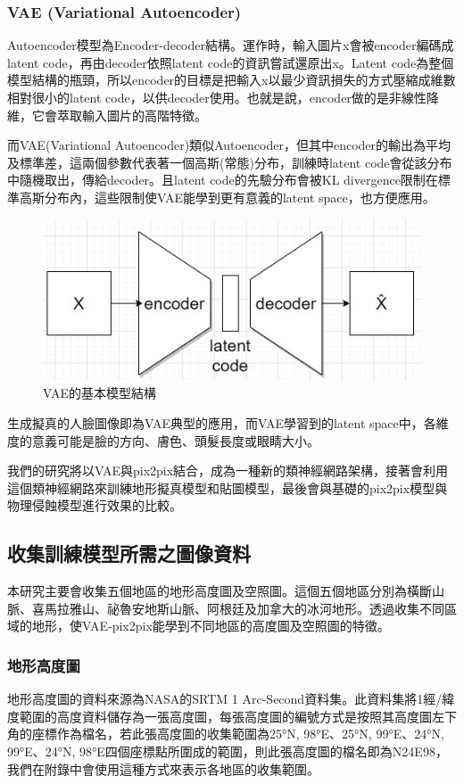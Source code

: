 \documentclass[a4paper, 12pt]{article}
\begin{document}
\subsubsection{VAE (Variational Autoencoder)}
Autoencoder模型為Encoder-decoder結構。運作時，輸入圖片x會被encoder編碼成latent code，再由decoder依照latent code的資訊嘗試還原出x。Latent code為整個模型結構的瓶頸，所以encoder的目標是把輸入x以最少資訊損失的方式壓縮成維數相對很小的latent code，以供decoder使用。也就是說，encoder做的是非線性降維，它會萃取輸入圖片的高階特徵。

而VAE(Variational Autoencoder)\cite{kingma2013auto}類似Autoencoder，但其中encoder的輸出為平均及標準差，這兩個參數代表著一個高斯(常態)分布，訓練時latent code會從該分布中隨機取出，傳給decoder。且latent code的先驗分布會被KL divergence限制在標準高斯分布內，這些限制使VAE能學到更有意義的latent space，也方便應用。

\begin{figure}[htbp]
    \centering
    \includegraphics[width=0.45\linewidth]{fig/6.jpg}
    \caption{VAE的基本模型結構}
    \label{fig:6}
\end{figure}

生成擬真的人臉圖像即為VAE典型的應用，而VAE學習到的latent space中，各維度的意義可能是臉的方向、膚色、頭髮長度或眼睛大小。

我們的研究將以VAE與pix2pix結合，成為一種新的類神經網路架構，接著會利用這個類神經網路來訓練地形擬真模型和貼圖模型，最後會與基礎的pix2pix模型與物理侵蝕模型進行效果的比較。



\subsection{收集訓練模型所需之圖像資料}
本研究主要會收集五個地區的地形高度圖及空照圖。這個五個地區分別為橫斷山脈、喜馬拉雅山、祕魯安地斯山脈、阿根廷及加拿大的冰河地形。透過收集不同區域的地形，使VAE-pix2pix能學到不同地區的高度圖及空照圖的特徵。
\subsubsection{地形高度圖}
地形高度圖的資料來源為NASA的SRTM 1 Arc-Second資料集。此資料集將1經/緯度範圍的高度資料儲存為一張高度圖，每張高度圖的編號方式是按照其高度圖左下角的座標作為檔名，若此張高度圖的收集範圍為25°N, 98°E、25°N, 99°E、24°N, 99°E、24°N, 98°E四個座標點所圍成的範圍，則此張高度圖的檔名即為N24E98，我們在附錄中會使用這種方式來表示各地區的收集範圍。
\end{document}

